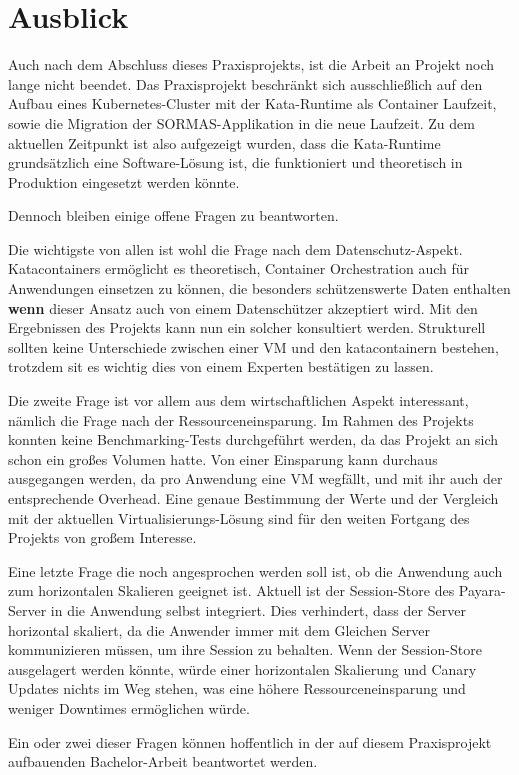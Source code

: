 \chapter{Ausblick}

Auch nach dem Abschluss dieses Praxisprojekts, ist die Arbeit an Projekt noch lange nicht beendet.
Das Praxisprojekt beschränkt sich ausschließlich auf den Aufbau eines Kubernetes-Cluster mit der Kata-Runtime als Container Laufzeit, sowie die Migration der \ac{SORMAS}-Applikation in die neue Laufzeit.
Zu dem aktuellen Zeitpunkt ist also aufgezeigt wurden, dass die Kata-Runtime grundsätzlich eine Software-Lösung ist, die funktioniert und theoretisch in Produktion eingesetzt werden könnte.

Dennoch bleiben einige offene Fragen zu beantworten.

Die wichtigste von allen ist wohl die Frage nach dem Datenschutz-Aspekt.
Katacontainers ermöglicht es theoretisch, Container Orchestration auch für Anwendungen einsetzen zu können, die besonders schützenswerte Daten enthalten \textbf{wenn} dieser Ansatz auch von einem Datenschützer akzeptiert wird.
Mit den Ergebnissen des Projekts kann nun ein solcher konsultiert werden. 
Strukturell sollten keine Unterschiede zwischen einer VM und den katacontainern bestehen, trotzdem sit es wichtig dies von einem Experten bestätigen zu lassen.

Die zweite Frage ist vor allem aus dem wirtschaftlichen Aspekt interessant, nämlich die Frage nach der Ressourceneinsparung.
Im Rahmen des Projekts konnten keine Benchmarking-Tests durchgeführt werden, da das Projekt an sich schon ein großes Volumen hatte.
Von einer Einsparung kann durchaus ausgegangen werden, da pro Anwendung eine \ac{VM} wegfällt, und mit ihr auch der entsprechende Overhead.
Eine genaue Bestimmung der Werte und der Vergleich mit der aktuellen Virtualisierungs-Lösung sind für den weiten Fortgang des Projekts von großem Interesse.

Eine letzte Frage die noch angesprochen werden soll ist, ob die Anwendung auch zum horizontalen Skalieren geeignet ist.
Aktuell ist der Session-Store des Payara-Server in die Anwendung selbst integriert. 
Dies verhindert, dass der Server horizontal skaliert, da die Anwender immer mit dem Gleichen Server kommunizieren müssen, um ihre Session zu behalten.
Wenn der Session-Store ausgelagert werden könnte, würde einer horizontalen Skalierung und Canary Updates nichts im Weg stehen, was eine höhere Ressourceneinsparung und weniger Downtimes ermöglichen würde.

Ein oder zwei dieser Fragen können hoffentlich in der auf diesem Praxisprojekt aufbauenden Bachelor-Arbeit beantwortet werden. 